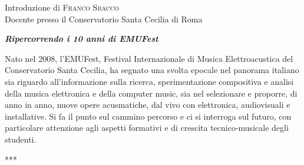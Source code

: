\documentclass[9pt,
			   twoside
			   ]{extreport}
\begin{document}
\begin{flushleft}
\bigskip

Introduzione di \textsc{Franco Sbacco}\\
{\footnotesize Docente presso il Conservatorio Santa Cecilia di Roma}


\bigskip

\textbf{\emph{Ripercorrendo i 10 anni di EMUFest}}

\medskip

Nato nel 2008, l’EMUFest, Festival Internazionale di Musica Elettroacustica del Conservatorio Santa Cecilia, ha segnato una svolta epocale nel panorama italiano sia riguardo all’informazione sulla ricerca, sperimentazione compositiva e analisi della musica elettronica e della computer music, sia nel selezionare e proporre, di anno in anno, nuove opere acusmatiche, dal vivo con elettronica, audiovisuali e installative. Si fa il punto sul cammino percorso e ci si interroga sul futuro, con particolare attenzione agli aspetti formativi e di crescita tecnico-musicale degli studenti.


\vfill



***

\end{flushleft}

\clearpage
\end{document}
